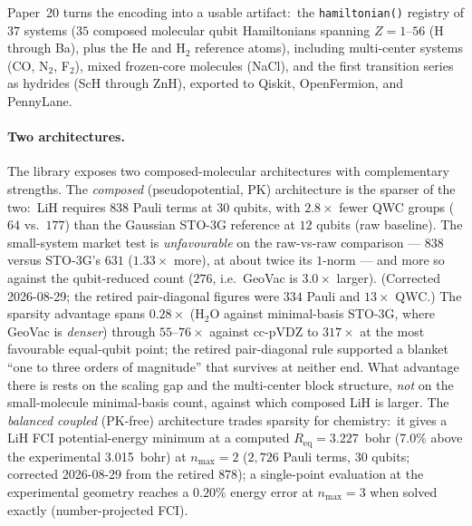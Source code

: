 \documentclass[aps,pra,twocolumn,superscriptaddress,longbibliography]{revtex4-2}
\newcommand{\gvq}[2]{#2}
\begin{document}
Paper~20 turns the encoding into a usable artifact:\ the
\texttt{hamiltonian()} registry of $37$ systems ($35$ composed molecular
qubit Hamiltonians spanning $Z=1$--$56$ (H through Ba),
plus the He and H$_2$ reference atoms), including multi-center systems
(CO, N$_2$, F$_2$), mixed frozen-core molecules (NaCl), and
the first transition series as hydrides (ScH through ZnH), exported to
Qiskit, OpenFermion, and PennyLane.

\paragraph{Two architectures.}
The library exposes two composed-molecular architectures with
complementary strengths.  The \emph{composed} (pseudopotential, PK)
architecture is the sparser of the two:\ LiH requires $\gvq{lih_composed_pauli}{838}$ Pauli terms
at $30$ qubits, with $2.8\times$ fewer QWC groups ($64$ vs.\ $\gvq{lih_sto3g_qwc}{177}$) than the
Gaussian STO-3G reference at $12$ qubits (raw baseline).  The small-system
market test is \emph{unfavourable} on the raw-vs-raw comparison --- $838$ versus
STO-3G's $\gvq{lih_sto3g_raw}{631}$ ($1.33\times$ more), at about twice its $1$-norm --- and more so against the
qubit-reduced count ($276$, i.e.\ GeoVac is $3.0\times$ larger).
(Corrected 2026-08-29; the retired pair-diagonal figures were $334$ Pauli
and $13\times$ QWC.)  The sparsity advantage spans $0.28\times$ (H$_2$O against minimal-basis
STO-3G, where GeoVac is \emph{denser}) through $55$--$76\times$ against
cc-pVDZ to $317\times$ at the most favourable equal-qubit point; the retired
pair-diagonal rule supported a blanket ``one to three orders of magnitude''
that survives at neither end.  What advantage there is rests on the scaling
gap and the multi-center block structure, \emph{not} on the small-molecule
minimal-basis count, against which composed LiH is larger.  The \emph{balanced coupled} (PK-free)
architecture trades sparsity for chemistry:\ it gives a LiH FCI
potential-energy minimum at a computed $R_{\mathrm{eq}}=3.227$~bohr (7.0\% above the
experimental 3.015~bohr) at $n_{\max}=2$ ($\gvq{lih_balanced_pauli}{2{,}726}$ Pauli terms, $30$
qubits; corrected 2026-08-29 from the retired $878$);
a single-point evaluation at the experimental geometry reaches a $0.20\%$
energy error at $n_{\max}=3$ when solved exactly (number-projected FCI).
\end{document}

